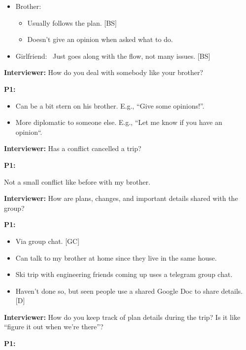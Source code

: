\documentclass[12pt,a4paper]{article}
\begin{document}
\begin{itemize}
    \item Brother: 
    \begin{itemize}
        \item Usually follows the plan. [BS]
        \item Doesn’t give an opinion when asked what to do.
    \end{itemize}
    \item Girlfriend: 
Just goes along with the flow, not many issues. [BS]

\end{itemize}

\textbf{Interviewer:} How do you deal with somebody like your brother?  

\textbf{P1:}

\begin{itemize}
    \item Can be a bit stern on his brother.
E.g., “Give some opinions!”.

    \item More diplomatic to someone else.
E.g., “Let me know if you have an opinion“. 

\end{itemize}

\textbf{Interviewer:} Has a conflict cancelled a trip?  

\textbf{P1:}

Not a small conflict like before with my brother. 

\textbf{Interviewer:} How are plans, changes, and important details shared with the group?

\textbf{P1:}

\begin{itemize}
    \item Via group chat. [GC]
    \item Can talk to my brother at home since they live in the same house. 
    \item Ski trip with engineering friends coming up uses a telegram group chat. 
    \item Haven’t done so, but seen people use a shared Google Doc to share details. [D]
\end{itemize}

\textbf{Interviewer:} How do you keep track of plan details during the trip? Is it like “figure it out when we’re there”?

\textbf{P1:}
\end{document}
